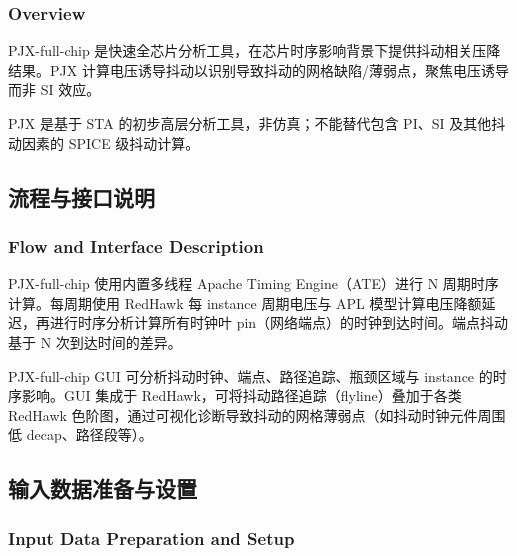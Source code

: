 \subsubsection*{Overview}

PJX-full-chip 是快速全芯片分析工具，在芯片时序影响背景下提供抖动相关压降结果。PJX 计算电压诱导抖动以识别导致抖动的网格缺陷/薄弱点，聚焦电压诱导而非 SI 效应。

PJX 是基于 STA 的初步高层分析工具，非仿真；不能替代包含 PI、SI 及其他抖动因素的 SPICE 级抖动计算。

\subsection{流程与接口说明}
\subsubsection*{Flow and Interface Description}

PJX-full-chip 使用内置多线程 Apache Timing Engine（ATE）进行 N 周期时序计算。每周期使用 RedHawk 每 instance 周期电压与 APL 模型计算电压降额延迟，再进行时序分析计算所有时钟叶 pin（网络端点）的时钟到达时间。端点抖动基于 N 次到达时间的差异。

PJX-full-chip GUI 可分析抖动时钟、端点、路径追踪、瓶颈区域与 instance 的时序影响。GUI 集成于 RedHawk，可将抖动路径追踪（flyline）叠加于各类 RedHawk 色阶图，通过可视化诊断导致抖动的网格薄弱点（如抖动时钟元件周围低 decap、路径段等）。

\subsection{输入数据准备与设置}
\subsubsection*{Input Data Preparation and Setup}

